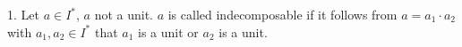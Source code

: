 1. Let $a \in I^*$, $a$ not a unit. $a$ is called indecomposable if it follows from $a = a_1 \cdot a_2$ with $a_1, a_2 \in I^*$ that $a_1$ is a unit or $a_2$ is a unit.
